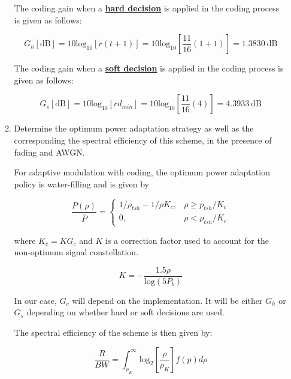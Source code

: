 \documentclass[fleqn]{article}
\begin{document}
\begin{enumerate}
\begin{enumerate}
			The coding gain when a \textbf{\underline{hard decision}} is applied in the coding process is given as follows:
			
			\begin{equation*}
				G_h[\text{dB}] = 10\text{log}_{10}[r(t+1)] = 10\text{log}_10\left[\frac{11}{16}(1+1)\right] = 1.3830 \ \text{dB}
			\end{equation*}
				
			The coding gain when a \textbf{\underline{soft decision}} is applied in the coding process is given as follows:
			
			\begin{equation*}
				G_s[\text{dB}] = 10\text{log}_{10}[rd_{min}] = 10\text{log}_10\left[\frac{11}{16}(4)\right] = 4.3933 \ \text{dB}
			\end{equation*}
			
			\item Determine the optimum power adaptation strategy as well as the corresponding the spectral efficiency of this scheme, in the presence of fading and AWGN.
			
			
			For adaptive modulation with coding, the optimum power adaptation policy is water-filling and is given by
			
			\begin{equation*}
				\frac{P(\rho)}{\bar{P}} = \begin{cases}
					1/\rho_{tsh} - 1/\rho K_c, & \rho \geq p_{tsh}/K_c\\
					0, & \rho < \rho_{tsh}/K_c
				\end{cases}
			\end{equation*}
			
			where $K_c = KG_c$ and $K$ is a correction factor used to account for the non-optimum signal constellation.
			
			\begin{equation*}
				K = -\frac{1.5\rho}{\text{log}(5P_b)}
			\end{equation*}
			
			In our case, $G_c$ will depend on the implementation. It will be either $G_h$ or $G_s$ depending on whether hard or soft decisions are used.
			 
			The spectral efficiency of the scheme is then given by:
			
			\begin{equation*}
				\frac{R}{BW} = \int_{\rho_K}^{\infty}{\text{log}_2\left[\frac{\rho}{\rho_K}\right]f(p)d\rho}
			\end{equation*}
			

\end{enumerate}
\end{enumerate}
\end{document}
